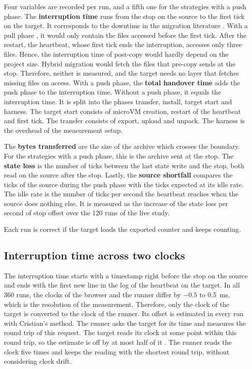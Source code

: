 Four variables are recorded per run, and a fifth one for the strategies with a push phase. 
The \textbf{interruption time} runs from the stop on the source to the first tick on the target. It corresponds to the downtime in the migration literature \cite{clark2005live}. With a pull phase \cite{hines2009post}, it would only contain the files accessed before the first tick. After the restart, the heartbeat, whose first tick ends the interruption, accesses only three files. Hence, the interruption time of post-copy would hardly depend on the project size. Hybrid migration would fetch the files that pre-copy sends at the stop. Therefore, neither is measured, and the target needs no layer that fetches missing files on access.
With a push phase, the \textbf{total handover time} adds the push phase to the interruption time. Without a push phase, it equals the interruption time. It is split into the phases transfer, install, target start and harness. The target start consists of microVM creation, restart of the heartbeat and first tick. The transfer consists of export, upload and unpack. The harness is the overhead of the measurement setup.

The \textbf{bytes transferred} are the size of the archive which crosses the boundary. For the strategies with a push phase, this is the archive sent at the stop. The \textbf{state loss} is the number of ticks between the last state write and the stop, both read on the source after the stop. 
Lastly, the \textbf{source shortfall} compares the ticks of the source during the push phase with the ticks expected at its idle rate. The idle rate is the number of ticks per second the heartbeat reaches when the source does nothing else. It is measured as the increase of the state loss per second of stop offset over the 120 runs of the live study.

Each run is correct if the target loads the exported counter and keeps counting.

\subsection{Interruption time across two clocks}

The interruption time starts with a timestamp right before the stop on the source and ends with the first new line in the log of the heartbeat on the target. In all 360 runs, the clocks of the browser and the runner differ by $-0.5$ to \SI{+0.5}{\milli\second}, which is the resolution of the measurement. Therefore, only the clock of the target is converted to the clock of the runner. Its offset is estimated in every run with Cristian's method. The runner asks the target for its time and measures the round trip of this request. The target reads its clock at some point within this round trip, so the estimate is off by at most half of it \cite{cristian1989probabilistic}. The runner reads the clock five times and keeps the reading with the shortest round trip, without considering clock drift.

